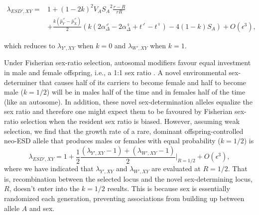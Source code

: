 \documentclass[12pt]{article}
\begin{document}
\begin{equation}
\begin{split}
\lambda_{ESD',XY} =& 1 + (1-2k)^2V_{A}{S_{A}}^2\frac{r-R}{r R} \\
&+\frac{k(\hat{p}^\male_Y-\hat{p}^\male_X)}{2}\left(k\left(2\alpha_{\Delta}^\male-2\alpha_{\Delta}^\female+t^\male-t^\female \right) -4(1-k)S_{A}\right)+O\left(\epsilon^3\right),
\end{split}
\label{eq:lambda_ESD_k}
\end{equation}

\noindent
which reduces to $\lambda_{Y',XY}$ when $k=0$ and $\lambda_{W',XY}$ when $k=1$. 

Under Fisherian sex-ratio selection, autosomal modifiers favour equal investment in male and female offspring, i.e., a 1:1 sex ratio \citep{Fisher:1930wy,Charnov:1982wg,West:2009we}. 
A novel environmental sex-determiner that causes half of its carriers to become female and half to become male ($k=1/2$) will be in males half of the time and in females half of the time (like an autosome).
In addition, these novel sex-determination alleles equalize the sex ratio and therefore one might expect them to be favoured by Fisherian sex-ratio selection when the resident sex ratio is biased.
However, assuming weak selection, we find that the growth rate of a rare, dominant offspring-controlled neo-ESD allele that produces males or females with equal probability ($k=1/2$) is
\begin{equation}
\lambda_{ESD',XY} =1+ \frac{1}{2}\frac{(\lambda_{Y',XY}-1) + (\lambda_{W',XY}-1)}{2} \Big|_{R=1/2} + O\left(\epsilon^3\right),
\label{eq:lambda_ESD}
\end{equation}
\noindent
where we have indicated that $\lambda_{Y',XY}$ and $\lambda_{W',XY}$ are evaluated at $R=1/2$.
That is, recombination between the selected locus and the novel sex-determining locus, $R$, doesn't enter into the $k=1/2$ results.
This is because sex is essentially randomized each generation, %
preventing associations from building up between allele $A$ and sex.  
\end{document}
